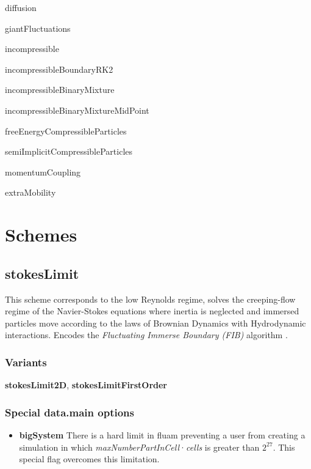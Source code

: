 \documentclass[a4paper,11pt]{refart}
\begin{document}
\begin{itemize}
\begin{multicols}{2}
\item diffusion
\item giantFluctuations
\item incompressible
\item incompressibleBoundaryRK2
\item incompressibleBinaryMixture
\item incompressibleBinaryMixtureMidPoint
\item freeEnergyCompressibleParticles
\item semiImplicitCompressibleParticles
\item momentumCoupling
\item extraMobility
\end{multicols}
\end{itemize}


\section{Schemes} \label{sec:schemes}


\subsection{stokesLimit}

This scheme corresponds to the low Reynolds regime, solves the creeping-flow regime of the Navier-Stokes equations where inertia is neglected and immersed particles move according to the laws of Brownian Dynamics with Hydrodynamic interactions. Encodes the \emph{Fluctuating Immerse Boundary (FIB)} algorithm \cite{FIB,Staggered,IBM}.


\subsubsection{Variants}
\textbf{stokesLimit2D}, \textbf{stokesLimitFirstOrder}

\subsubsection{Special data.main options}

\begin{itemize}
\item \textbf{bigSystem} There is a hard limit in fluam preventing a user from creating a simulation in which \emph{maxNumberPartInCell}·\emph{cells} is greater than $2^{27}$. This special flag overcomes this limitation.
\end{itemize}
\end{document}
